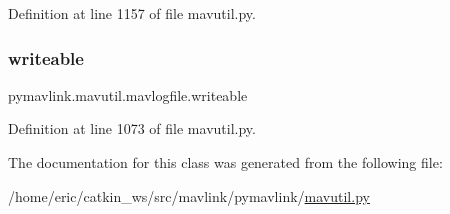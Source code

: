 Definition at line 1157 of file mavutil.\+py.

\mbox{\label{classpymavlink_1_1mavutil_1_1mavlogfile_ac73cb55ec50193f973c5104a4b893d64}} 
\subsubsection{\texorpdfstring{writeable}{writeable}}
{\footnotesize\ttfamily pymavlink.\+mavutil.\+mavlogfile.\+writeable}



Definition at line 1073 of file mavutil.\+py.



The documentation for this class was generated from the following file\+:\begin{DoxyCompactItemize}
\item 
/home/eric/catkin\+\_\+ws/src/mavlink/pymavlink/\mbox{\hyperlink{mavutil_8py}{mavutil.\+py}}\end{DoxyCompactItemize}

